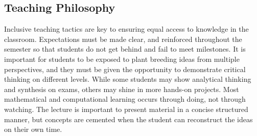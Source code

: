 \documentclass[11pt]{article}
\begin{document}



\subsection*{Teaching Philosophy}

Inclusive teaching tactics are key to ensuring equal access to knowledge in the classroom. Expectations must be made clear, and reinforced throughout the semester so that students do not get behind and fail to meet milestones. It is important for students to be exposed to plant breeding ideas from multiple perspectives, and they must be given the opportunity to demonstrate critical thinking on different levels. While some students may show analytical thinking and synthesis on exams, others may shine in more hands-on projects. Most mathematical and computational learning occurs through doing, not through watching. The lecture is important to present material in a concise structured manner, but concepts are cemented when the student can reconstruct the ideas on their own time.
\end{document}
